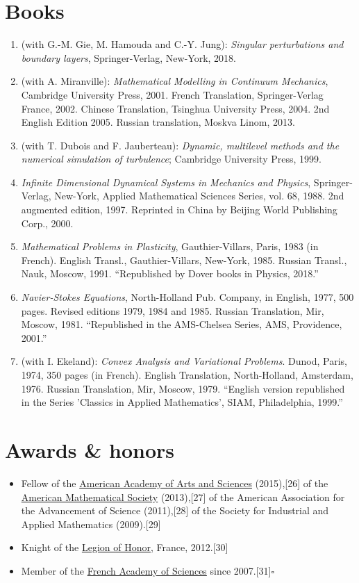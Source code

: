 \documentclass{book}
\numberwithin{equation}{section}
\begin{document}
\section{Books}
\begin{enumerate}
    \item (with G.-M. Gie, M. Hamouda and C.-Y. Jung): \textit{Singular perturbations and boundary layers}, Springer-Verlag, New-York, 2018.
    \item (with A. Miranville): \textit{Mathematical Modelling in Continuum Mechanics}, Cambridge University Press, 2001. French Translation, Springer-Verlag France, 2002. Chinese Translation, Tsinghua University Press, 2004. 2nd English Edition 2005. Russian translation, Moskva Linom, 2013.
    \item (with T. Dubois and F. Jauberteau): \textit{Dynamic, multilevel methods and the numerical simulation of turbulence}; Cambridge University Press, 1999.
    \item \textit{Infinite Dimensional Dynamical Systems in Mechanics and Physics}, Springer-Verlag, New-York, Applied Mathematical Sciences Series, vol. 68, 1988. 2nd augmented edition, 1997. Reprinted in China by Beijing World Publishing Corp., 2000.
    \item \textit{Mathematical Problems in Plasticity}, Gauthier-Villars, Paris, 1983 (in French). English Transl., Gauthier-Villars, New-York, 1985. Russian Transl., Nauk, Moscow, 1991. ``Republished by Dover books in Physics, 2018.''
    \item \textit{Navier-Stokes Equations}, North-Holland Pub. Company, in English, 1977, 500 pages. Revised editions 1979, 1984 and 1985. Russian Translation, Mir, Moscow, 1981. ``Republished in the AMS-Chelsea Series, AMS, Providence, 2001.''
    \item (with I. Ekeland): \textit{Convex Analysis and Variational Problems}. Dunod, Paris, 1974, 350 pages (in French). English Translation, North-Holland, Amsterdam, 1976. Russian Translation, Mir, Moscow, 1979. ``English version republished in the Series 'Classics in Applied Mathematics', SIAM, Philadelphia, 1999.''
\end{enumerate}

\section{Awards \& honors}
\begin{itemize}
    \item Fellow of the \href{https://en.wikipedia.org/wiki/American_Academy_of_Arts_and_Sciences}{American Academy of Arts and Sciences} (2015),[26] of the \href{https://en.wikipedia.org/wiki/American_Mathematical_Society}{American Mathematical Society} (2013),[27] of the American Association for the Advancement of Science (2011),[28] of the Society for Industrial and Applied Mathematics (2009).[29]
    \item Knight of the \href{https://en.wikipedia.org/wiki/Legion_of_Honour}{Legion of Honor}, France, 2012.[30]
    \item Member of the \href{https://en.wikipedia.org/wiki/French_Academy_of_Sciences}{French Academy of Sciences} since 2007.[31]\hfill$\square$
\end{itemize}
\end{document}
